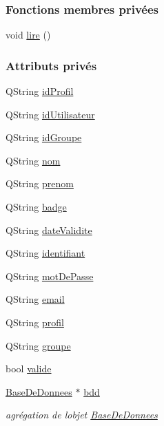 \subsubsection*{Fonctions membres privées}
\begin{DoxyCompactItemize}
\item 
void \hyperlink{class_utilisateur_aa7d1a92ff4e06e9d302369f6c48884e1}{lire} ()
\end{DoxyCompactItemize}
\subsubsection*{Attributs privés}
\begin{DoxyCompactItemize}
\item 
Q\+String \hyperlink{class_utilisateur_a042947e8b86637d1eb012c3fc89a959e}{id\+Profil}
\item 
Q\+String \hyperlink{class_utilisateur_ae1763e7a52c82c63506bc4160cdabb20}{id\+Utilisateur}
\item 
Q\+String \hyperlink{class_utilisateur_a13c3425772da1d5501e6fe4a2f2b8194}{id\+Groupe}
\item 
Q\+String \hyperlink{class_utilisateur_a1096e809aca4b7cf453a7af93cb72502}{nom}
\item 
Q\+String \hyperlink{class_utilisateur_a1dd0779807b19298f30f39d9c371170f}{prenom}
\item 
Q\+String \hyperlink{class_utilisateur_a77b48aa9d1f0ec04c69d45476897fec6}{badge}
\item 
Q\+String \hyperlink{class_utilisateur_a898cd6f5a64d733ad49a8a74388326cd}{date\+Validite}
\item 
Q\+String \hyperlink{class_utilisateur_a1e79e47202a2c716346f47adbbeb2511}{identifiant}
\item 
Q\+String \hyperlink{class_utilisateur_a4f6a17d0fb5c231bcb414396236a056f}{mot\+De\+Passe}
\item 
Q\+String \hyperlink{class_utilisateur_a2f45443ce5277a5e6baefe5121e66555}{email}
\item 
Q\+String \hyperlink{class_utilisateur_ab03707f32fadf99ae0a0a27d59470646}{profil}
\item 
Q\+String \hyperlink{class_utilisateur_af795d9518a4eebe00c5b24937732ab2b}{groupe}
\item 
bool \hyperlink{class_utilisateur_ad8b12c53bc07491a54895d48631ef6a2}{valide}
\item 
\hyperlink{class_base_de_donnees}{Base\+De\+Donnees} $\ast$ \hyperlink{class_utilisateur_a94fa14e95bd90358fb67eca0170e1724}{bdd}
\begin{DoxyCompactList}\small\item\em agrégation de l\textquotesingle{}objet \hyperlink{class_base_de_donnees}{Base\+De\+Donnees} \end{DoxyCompactList}\end{DoxyCompactItemize}


